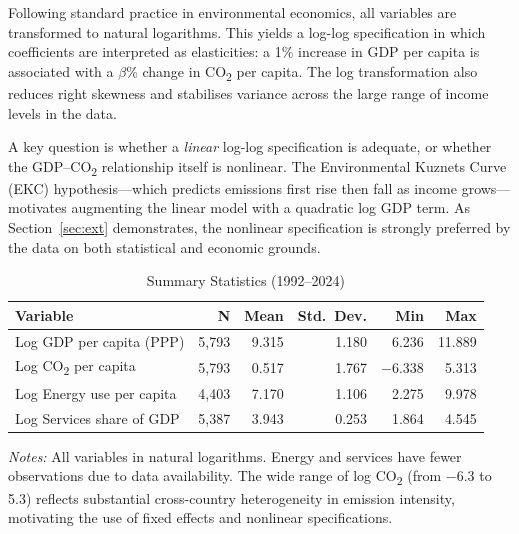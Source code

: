 \documentclass[12pt, a4paper]{article}
\begin{document}
Following standard practice in environmental economics, all variables are transformed to natural logarithms. This yields a log-log specification in which coefficients are interpreted as elasticities: a 1\% increase in GDP per capita is associated with a $\beta$\% change in CO\textsubscript{2} per capita. The log transformation also reduces right skewness and stabilises variance across the large range of income levels in the data.

A key question is whether a \emph{linear} log-log specification is adequate, or whether the GDP--CO\textsubscript{2} relationship itself is nonlinear. The Environmental Kuznets Curve (EKC) hypothesis---which predicts emissions first rise then fall as income grows---motivates augmenting the linear model with a quadratic log GDP term. As Section~\ref{sec:ext} demonstrates, the nonlinear specification is strongly preferred by the data on both statistical and economic grounds.

\begin{table}[H]
\centering
\caption{Summary Statistics (1992--2024)}
\label{tab:sumstats}
\begin{threeparttable}
\begin{tabular}{lrrrrr}
\toprule
Variable & N & Mean & Std.\ Dev. & Min & Max \\
\midrule
Log GDP per capita (PPP) & 5,793 & 9.315 & 1.180 & 6.236 & 11.889 \\
Log CO\textsubscript{2} per capita & 5,793 & 0.517 & 1.767 & $-$6.338 & 5.313 \\
Log Energy use per capita & 4,403 & 7.170 & 1.106 & 2.275 & 9.978 \\
Log Services share of GDP & 5,387 & 3.943 & 0.253 & 1.864 & 4.545 \\
\bottomrule
\end{tabular}
\begin{tablenotes}
\small
\item \textit{Notes:} All variables in natural logarithms. Energy and services have fewer observations due to data availability. The wide range of log CO\textsubscript{2} (from $-$6.3 to 5.3) reflects substantial cross-country heterogeneity in emission intensity, motivating the use of fixed effects and nonlinear specifications.
\end{tablenotes}
\end{threeparttable}
\end{table}

\end{document}
